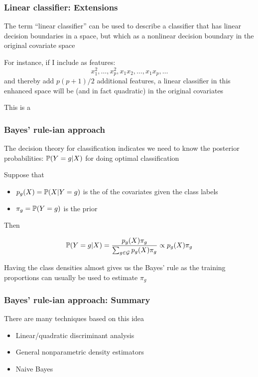 \documentclass[12pt]{beamer}
\begin{document}
\begin{frame}
\frametitle{Linear classifier: Extensions}
The term ``linear classifier'' can be used to describe a classifier that has linear decision boundaries
in a  space, but which as a nonlinear decision boundary in the original
covariate space

\vsp
For instance, if I include as features:
\[
x_1^2, \ldots, x_p^2, x_1x_2, \ldots, x_1x_p, \ldots 
\]
and thereby add $p(p+1)/2$ additional features, a linear classifier 
in this enhanced space will be  (and in fact quadratic) in
the original covariates

\vsp
This is a 
\end{frame}

\begin{frame}
\frametitle{Bayes' rule-ian approach}
The decision theory for classification indicates we need to know
the posterior probabilities: $\P(Y = g | X)$ for doing optimal classification

\vsp
Suppose that
\begin{itemize}
\item $p_g(X) = \P(X | Y = g)$ is the  of the covariates
given the class labels 
\item$\pi_g = \P(Y=g)$ is the prior
\end{itemize}

Then

\[
\P(Y = g | X) = \frac{p_g(X) \pi_g}{\sum_{g \in \mathcal{G}}p_g(X) \pi_g}  \propto p_g(X) \pi_g
\]

 Having the class densities almost gives us the Bayes' rule as 
the training proportions can usually be used to estimate $\pi_g$

\end{frame}

\begin{frame}
\frametitle{Bayes' rule-ian approach: Summary}
There are many techniques based on this idea
\begin{itemize}
\item Linear/quadratic discriminant analysis

\item General nonparametric density estimators
\item Naive Bayes

\end{itemize}
\end{frame}
\end{document}
